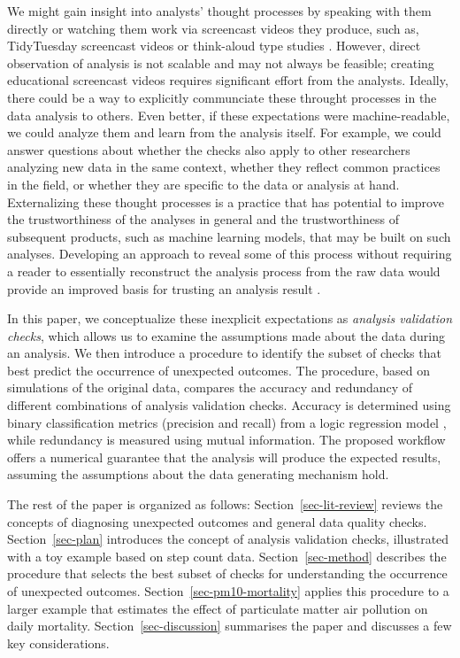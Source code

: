 \documentclass[
  12pt,
]{interact}
\begin{document}
We might gain insight into analysts' thought processes by speaking with
them directly or watching them work via screencast videos they produce,
such as, TidyTuesday screencast videos or think-aloud type studies
\citep[e.g.][]{gu2024data}. However, direct observation of analysis is
not scalable and may not always be feasible; creating educational
screencast videos requires significant effort from the analysts.
Ideally, there could be a way to explicitly communciate these throught
processes in the data analysis to others. Even better, if these
expectations were machine-readable, we could analyze them and learn from
the analysis itself. For example, we could answer questions about
whether the checks also apply to other researchers analyzing new data in
the same context, whether they reflect common practices in the field, or
whether they are specific to the data or analysis at hand. Externalizing
these thought processes is a practice that has potential to improve the
trustworthiness of the analyses \citep{yu2024veridical} in general and
the trustworthiness of subsequent products, such as machine learning
models, that may be built on such analyses. Developing an approach to
reveal some of this process without requiring a reader to essentially
reconstruct the analysis process from the raw data would provide an
improved basis for trusting an analysis result
\citep{peng2021reproducible}.

In this paper, we conceptualize these inexplicit expectations as
\emph{analysis validation checks}, which allows us to examine the
assumptions made about the data during an analysis. We then introduce a
procedure to identify the subset of checks that best predict the
occurrence of unexpected outcomes. The procedure, based on simulations
of the original data, compares the accuracy and redundancy of different
combinations of analysis validation checks. Accuracy is determined using
binary classification metrics (precision and recall) from a logic
regression model \citep{ruczinski_logic_2003}, while redundancy is
measured using mutual information. The proposed workflow offers a
numerical guarantee that the analysis will produce the expected results,
assuming the assumptions about the data generating mechanism hold.

The rest of the paper is organized as follows:
Section~\ref{sec-lit-review} reviews the concepts of diagnosing
unexpected outcomes and general data quality checks.
Section~\ref{sec-plan} introduces the concept of analysis validation
checks, illustrated with a toy example based on step count data.
Section~\ref{sec-method} describes the procedure that selects the best
subset of checks for understanding the occurrence of unexpected
outcomes. Section~\ref{sec-pm10-mortality} applies this procedure to a
larger example that estimates the effect of particulate matter air
pollution on daily mortality. Section~\ref{sec-discussion} summarises
the paper and discusses a few key considerations.
\end{document}
